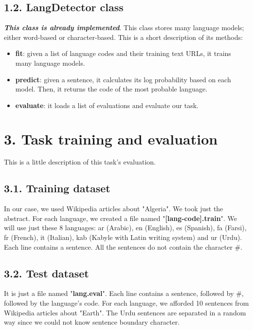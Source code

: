 \documentclass[11pt, a4paper]{article}
\begin{document}
\subsection*{1.2. LangDetector class}

\textbf{\slshape This class is already implemented}. 
This class stores many language models; either word-based or character-based.
This is a short description of its methods:
\begin{itemize}
	\item \textbf{fit}: given a list of language codes and their training text URLs, it trains many language models.
	\item \textbf{predict}: given a sentence, it calculates its log probability based on each model. 
	Then, it returns the code of the most probable language.
	\item \textbf{evaluate}: it loads a list of evaluations and evaluate our task.
\end{itemize}

\section*{3. Task training and evaluation}

This is a little description of this task's evaluation.

\subsection*{3.1. Training dataset}

In our case, we used Wikipedia articles about "Algeria".
We took just the abstract.
For each language, we created a file named "\textbf{[lang-code].train}". 
We will use just these 8 languages: ar (Arabic), en (English), es (Spanish), fa (Farsi), fr (French), it (Italian), kab (Kabyle with Latin writing system) and ur (Urdu).
Each line contains a sentence.
All the sentences do not contain the character \#.

\subsection*{3.2. Test dataset}

It is just a file named "\textbf{lang.eval}".
Each line contains a sentence, followed by \#, followed by the language's code.
For each language, we afforded 10 sentences from Wikipedia articles about "Earth".
The Urdu sentences are separated in a random way since we could not know sentence boundary character.
\end{document}
